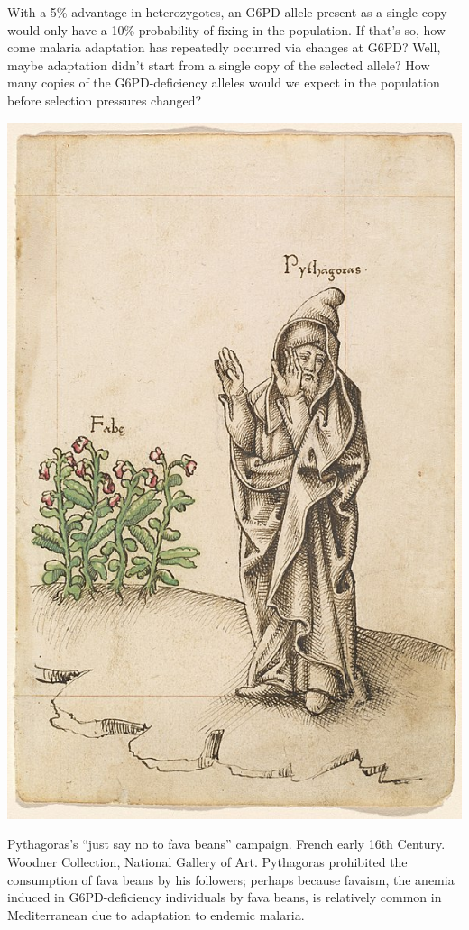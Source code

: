 With a 5\% advantage in heterozygotes, an G6PD allele present as a
single copy would only have a 10\% probability of
fixing in the population. If that's so, how come malaria adaptation has
repeatedly occurred via changes at G6PD? Well, maybe adaptation didn't
start from a single copy of the selected allele? How many copies of
the G6PD-deficiency alleles would we expect in the population before
selection pressures changed? 
\begin{marginfigure}
\begin{center}
  \includegraphics[width=\textwidth]{illustration_images/Genetic_drift_selection/Pythagoras_fava_beans/586px-Do_Not_Eat_Beans.jpg}
\caption{
Pythagoras's ``just say no to fava beans'' campaign. French early 16th Century. Woodner Collection, National Gallery of Art.
Pythagoras prohibited the consumption of fava beans by his followers; perhaps because favaism, the anemia induced in G6PD-deficiency
individuals by fava beans, is relatively common in Mediterranean due
to adaptation to endemic malaria. } \label{fig:fava}
\end{center}
\end{marginfigure}

